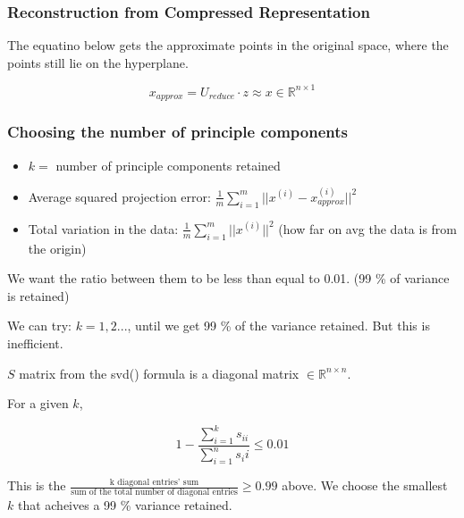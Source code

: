 \documentclass{article}
\begin{document}
\subsubsection{Reconstruction from Compressed Representation}

The equatino below gets the approximate points in the original space, where the points still lie on the hyperplane.

\begin{equation}
    x_{approx} = U_{reduce} \cdot z \approx x \in \mathbb{R}^{n \times 1 } 
\end{equation}


\subsubsection{Choosing the number of principle components}


\begin{itemize}
\item $k =$ number of principle components retained

\item Average squared projection error: $\frac{1}{m} \sum_{i=1}^m \vert \vert x^{(i)} - x_{approx}^{(i)} \vert \vert^2$

\item Total variation in the data: $\frac{1}{m} \sum_{i=1}^m \vert \vert x^{(i)} \vert \vert ^2$ (how far on avg the data is from the origin)
\end{itemize}

We want the ratio between them to be less than equal to 0.01. (99 \% of variance is retained)




We can try: $k = 1,2...$, until we get 99 \% of the variance retained. But this is inefficient. 


$S$ matrix from the svd() formula is a diagonal matrix $\in \mathbb{R}^{n \times n}$.


\begin{mybox}
For a given $k$, 

\begin{equation}
    1 - \frac{\sum_{i=1}^k s_{ii}}{\sum_{i=1}^n s_ii} \leq 0.01
\end{equation}

This is the $\frac{\text{k diagonal entries' sum}}{\text{sum of the total number of diagonal entries}} \geq 0.99$ above. We choose the smallest $k$ that acheives a 99 \% variance retained.

\end{mybox}
\end{document}
